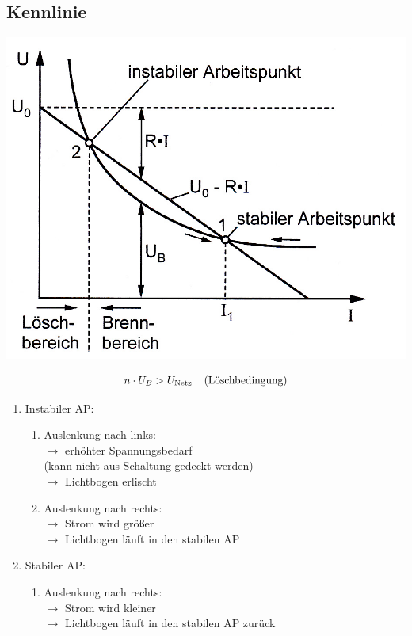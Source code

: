\documentclass[a4paper,twocolumn,10pt]{article}
\begin{document}
\subsection{Kennlinie}
\begin{center}
\includegraphics[width=0.98\columnwidth]{Grafiken/Lichtbogen}
\end{center}
\begin{equation*}
n\cdot U_B>U_{\text{Netz}}\;\;\;\;\text{(Löschbedingung)}\\
\end{equation*}
\begin{enumerate}[label=$\bullet$]
\item Instabiler AP:
\begin{enumerate}[label=-]
\item Auslenkung nach links:\\
$\rightarrow$ erhöhter Spannungsbedarf\\
(kann nicht aus Schaltung gedeckt werden)\\
$\rightarrow$ Lichtbogen erlischt
\item Auslenkung nach rechts:\\
$\rightarrow$ Strom wird größer\\
$\rightarrow$ Lichtbogen läuft in den stabilen AP
\end{enumerate}
\item Stabiler AP:
\begin{enumerate}[label=-]
\item Auslenkung nach rechts:\\
$\rightarrow$ Strom wird kleiner\\
$\rightarrow$ Lichtbogen läuft in den stabilen AP zurück
\end{enumerate}
\end{enumerate}
\end{document}
